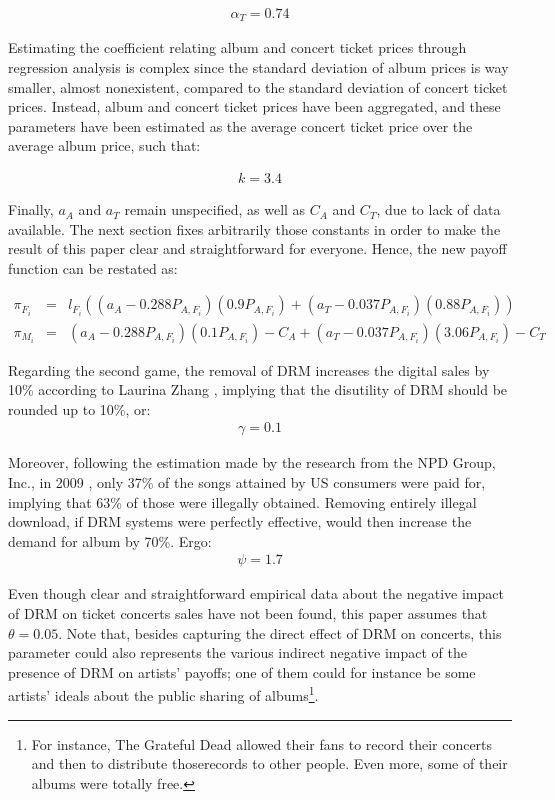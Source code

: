 \documentclass[letter,12pt]{article}
\numberwithin{equation}{section}
\begin{document}
\begin{eqnarray*}
\alpha_{T} = 0.74
\end{eqnarray*}

Estimating the coefficient relating album and concert ticket prices
through regression analysis is complex since the standard deviation
of album prices is way smaller, almost nonexistent, compared to the
standard deviation of concert ticket prices. Instead, album and concert
ticket prices have been aggregated, and these parameters have been estimated
as the average concert ticket price over the average album price,
such that:

\begin{eqnarray*}
k=3.4
\end{eqnarray*}

Finally, $a_{A}$ and $a_{T}$ remain unspecified, as well as $C_{A}$ and
$C_{T}$, due to lack of data available. The next section fixes arbitrarily
those constants in order to make the result of this paper clear and
straightforward for everyone. Hence, the new payoff function can be
restated as:

\begin{eqnarray*}
\pi_{F_{i}} & = & l_{F_{i}}((a_{A}-0.288P_{A,F_{i}})(0.9P_{A,F_{i}})+(a_{T}-0.037P_{A,F_{i}})(0.88P_{A,F_{i}}))\\
\pi_{M_i} & = & (a_{A}-0.288P_{A,F_{i}})(0.1P_{A,F_{i}})-C_{A}+(a_{T}-0.037P_{A,F_{i}})(3.06P_{A,F_{i}})-C_{T}
\end{eqnarray*}

Regarding the second game, the removal of DRM increases the digital
sales by 10\% according to Laurina Zhang \cite{zhang2014}, implying
that the disutility of DRM should be rounded up to 10\%, or:
\begin{eqnarray*}
\gamma=0.1
\end{eqnarray*}

Moreover, following the estimation made by the research from the NPD
Group, Inc., in 2009 \cite{npd2009}, only 37\% of the songs attained
by US consumers were paid for, implying that 63\% of those were illegally
obtained. Removing entirely illegal download, if DRM systems were
perfectly effective, would then increase the demand for album by 70\%.
Ergo:
\begin{eqnarray*}
\psi=1.7
\end{eqnarray*}

Even though clear and straightforward empirical data about the negative
impact of DRM on ticket concerts sales have not been found, this paper
assumes that $\theta=0.05$. Note that, besides capturing the direct
effect of DRM on concerts, this parameter could also represents the
various indirect negative impact of the presence of DRM on artists’
payoffs; one of them could for instance be some artists’ ideals about
the public sharing of albums\footnote{
For instance, The Grateful Dead allowed their fans to record their
concerts and then to distribute thoserecords to other people. Even
more, some of their albums were totally free.
}.\\
\end{document}

